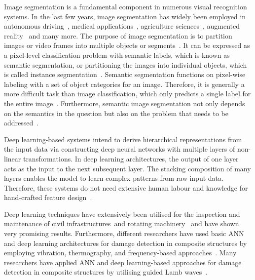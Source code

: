\begin{sloppypar}
	Image segmentation is a fundamental component in numerous visual recognition
	systems. In the last few years, image segmentation has widely been
	employed in autonomous driving~\cite{ros2016synthia, li2018real}, medical applications~\cite{taghanaki2021deep}, agriculture sciences~\cite{milioto2018real}, augmented reality~\cite{miksik2015semantic} and many more. 
	The purpose of image segmentation is to partition images or video frames into multiple objects or segments~\cite{szeliski2010computer}.
	It can be expressed as a pixel-level classification problem with semantic labels, which is known as semantic segmentation, or partitioning the images into individual objects, which is called instance segmentation~\cite{szeliski2010computer, minaee2021image}. 
	Semantic segmentation functions on pixel-wise labeling with a set of object categories for an image. 
	Therefore, it is generally a more difficult task than image classification, which only predicts a single label for the entire image~\cite{minaee2021image}.
	Furthermore, semantic image segmentation not only depends on the semantics in the question but also on the problem that needs to be addressed~\cite{ghosh2019understanding}.

	Deep learning-based systems intend to derive hierarchical representations from the input data via constructing deep neural networks with multiple layers of non-linear transformations.
	In deep learning architectures, the output of one layer acts as the input to the next subsequent layer.
	The stacking composition of many layers enables the model to learn complex patterns from raw input data.
	Therefore, these systems do not need extensive human labour and knowledge for hand-crafted feature design~\cite{Zhao2019b}. %

	Deep learning techniques have extensively been utilised for the inspection 
	and maintenance of civil infrastructures~\DIFdelbegin {}\DIFdelend \DIFaddbegin {}\DIFaddend and rotating 
	machinery~\cite{janssens2016convolutional, Jia2016a} and have shown very 
	promising results.
	Furthermore, different researchers have used basic ANN and deep learning architectures for damage detection in composite structures by employing vibration, thermography, and frequency-based approaches~\cite{chakraborty2005artificial, Khan2019a, luo2019temporal, bang2020defect}. 
	Many researchers have applied ANN and deep learning-based approaches for damage detection in composite structures by utilising guided Lamb waves~\cite{Su2004a, chetwynd2008damage, de2015application, feng2019locating, mardanshahi2020detection, qian2020application, Tabian2019, rautela2021ultrasonic}.


\end{sloppypar}

